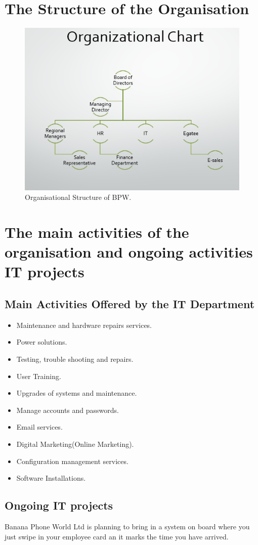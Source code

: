 \section{The Structure of the Organisation}

\begin{figure}[h!]
\begin{center}
	\includegraphics[scale=0.9]{img/Chart.PNG}
	\caption{Organisational Structure of BPW.}
	\label{fig:symbols}
\end{center}
\end{figure}


\section{The main activities of the organisation and ongoing activities IT projects}
\subsection{Main Activities Offered by the IT Department} 
\medskip
\begin{itemize}
\item Maintenance and hardware repairs services.
\item Power solutions. 
\item Testing, trouble shooting and repairs.
\item User Training.
\item Upgrades of systems and maintenance.
\item Manage accounts and passwords.
\item Email services.
\item Digital Marketing(Online Marketing).
\item Configuration management services.
\item Software Installations.
\end{itemize}
\subsection{Ongoing IT projects}
Banana Phone World Ltd is planning to bring in a system on board where you just swipe in your employee card an it marks the time you have arrived.